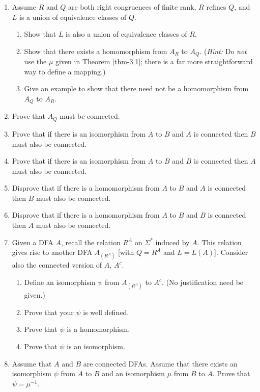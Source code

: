 \begin{enumerate}[{3.}1. ]
\item Assume $R$ and $Q$ are both right congruences of finite rank, $R$ refines
$Q$, and $L$ is a union of equivalence classes of $Q$.
\begin{enumerate}
\item Show that $L$ is also a union of equivalence classes of $R$.
\item Show that there exists a homomorphism from $A_R$ to $A_Q$. (\emph{Hint:}
Do \emph{not} use the $\mu$ given in Theorem \ref{thm-3.1}; there is a far more
straightforward way to define a mapping.)
\item Give an example to show that there need not be a homomorphism from $A_Q$
to $A_R$.
\end{enumerate}

\item Prove that $A_Q$ must be connected.

\item Prove that if there is an isomorphism from $A$ to $B$ and $A$ is connected
then $B$ must also be connected.

\item Prove that if there is an isomorphism from $A$ to $B$ and $B$ is connected
then $A$ must also be connected.

\item Disprove that if there is a homomorphism from $A$ to $B$ and $A$ is
connected then $B$ must also be connected.

\item Disprove that if there is a homomorphism from $A$ to $B$ and $B$ is
connected then $A$ must also be connected.

\item Given a DFA $A$, recall the relation $R^A$ on $\Sigma^*$ induced by $A$.
This relation gives rise to another DFA $A_{(R^A)}$ [with $Q=R^A$ and $L=L(A)$].
Consider also the connected version of $A$, $A^c$.
\begin{enumerate}
\item Define an isomorphism $\psi$ from $A_{(R^A)}$ to $A^c$. (No justification
need be given.)
\item Prove that your $\psi$ is well defined.
\item Prove that $\psi$ is a homomorphism.
\item Prove that $\psi$ is an isomorphism.
\end{enumerate}

\item Assume that $A$ and $B$ are connected DFAs. Assume that there exists an
isomorphism $\psi$ from $A$ to $B$ and an isomorphism $\mu$ from $B$ to $A$.
Prove that $\psi = \mu^{-1}$.


\end{enumerate}
